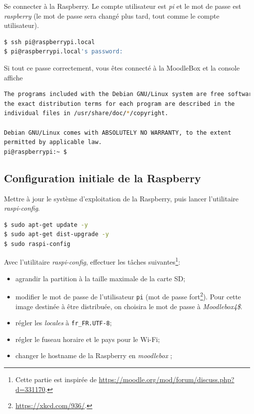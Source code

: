 \documentclass[11pt]{article}
\begin{document}
Se connecter à la Raspberry. Le compte utilisateur est \emph{pi} et le mot de passe est \emph{raspberry} (le mot de passe sera changé plus tard, tout comme le compte utilisateur).

\begin{lstlisting}[language=bash]
$ ssh pi@raspberrypi.local
$ pi@raspberrypi.local's password: 
\end{lstlisting}

\begin{verification}
Si tout ce passe correctement, vous êtes connecté à la MoodleBox et la console affiche

\begin{lstlisting}[language=bash]
The programs included with the Debian GNU/Linux system are free software;
the exact distribution terms for each program are described in the
individual files in /usr/share/doc/*/copyright.

Debian GNU/Linux comes with ABSOLUTELY NO WARRANTY, to the extent
permitted by applicable law.
pi@raspberrypi:~ $
\end{lstlisting}
\end{verification}

\subsection{Configuration initiale de la Raspberry}

Mettre à jour le système d'exploitation de la Raspberry, puis lancer l'utilitaire \emph{raspi-config}.

\begin{lstlisting}[language=bash]
$ sudo apt-get update -y
$ sudo apt-get dist-upgrade -y
$ sudo raspi-config
\end{lstlisting}

Avec l'utilitaire \emph{raspi-config}, effectuer les tâches suivantes\footnote{Cette partie est inspirée de \url{https://moodle.org/mod/forum/discuss.php?d=331170}.}:
\begin{itemize}
\item agrandir la partition à la taille maximale de la carte SD;
\item modifier le mot de passe de l'utilisateur \lstinline{pi} (mot de passe fort\footnote{\url{https://xkcd.com/936/}.}). Pour cette image destinée à être distribuée, on choisira le mot de passe à \emph{Moodlebox4\$}.
\item régler les \emph{locales} à \lstinline{fr_FR.UTF-8};
\item régler le fuseau horaire et le pays pour le Wi-Fi;
\item changer le hostname de la Raspberry en \emph{moodlebox} ;
\end{itemize}
\end{document}
